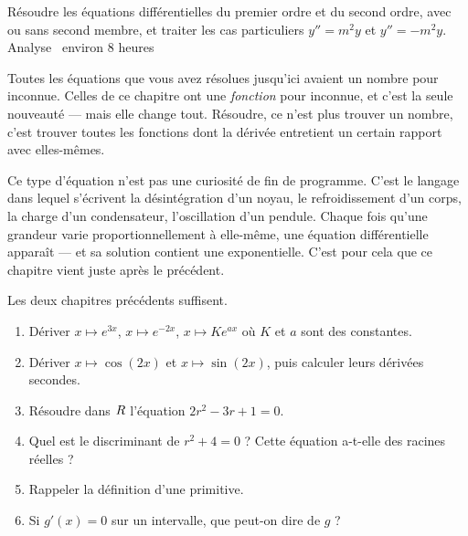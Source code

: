   {Résoudre les équations différentielles du premier ordre et du second ordre,
   avec ou sans second membre, et traiter les cas particuliers
   $y''=m^{2}y$ et $y''=-m^{2}y$.}
  {Analyse \textbullet\ environ 8 heures}

Toutes les équations que vous avez résolues jusqu'ici avaient un nombre pour
inconnue. Celles de ce chapitre ont une \emph{fonction} pour inconnue, et
c'est la seule nouveauté — mais elle change tout. Résoudre, ce n'est plus
trouver un nombre, c'est trouver toutes les fonctions dont la dérivée
entretient un certain rapport avec elles-mêmes.

Ce type d'équation n'est pas une curiosité de fin de programme. C'est le
langage dans lequel s'écrivent la désintégration d'un noyau, le
refroidissement d'un corps, la charge d'un condensateur, l'oscillation d'un
pendule. Chaque fois qu'une grandeur varie proportionnellement à elle-même,
une équation différentielle apparaît — et sa solution contient une
exponentielle. C'est pour cela que ce chapitre vient juste après le
précédent.

\begin{revision}
Les deux chapitres précédents suffisent.

\begin{enumerate}[label=\textbf{\arabic*.}, leftmargin=*, itemsep=0.35em]
  \item Dériver $x \mapsto e^{3x}$, $x \mapsto e^{-2x}$, $x \mapsto Ke^{ax}$
        où $K$ et $a$ sont des constantes.
  \item Dériver $x \mapsto \cos(2x)$ et $x \mapsto \sin(2x)$, puis calculer
        leurs dérivées secondes.
  \item Résoudre dans $R$ l'équation $2r^{2}-3r+1 = 0$.
  \item Quel est le discriminant de $r^{2}+4 = 0$ ? Cette équation a-t-elle des
        racines réelles ?
  \item Rappeler la définition d'une primitive.
  \item Si $g'(x) = 0$ sur un intervalle, que peut-on dire de $g$ ?
\end{enumerate}
\end{revision}

